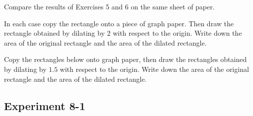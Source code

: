\documentclass[12pt]{book} %
\begin{document}
\begin{ExerciseList}
Compare the results of Exercises 5 and 6 on the same sheet of paper.

\Exercise In each case copy the rectangle onto a piece of graph paper. Then draw the rectangle obtained by dilating by 2 with respect to the origin. Write down the area of the original rectangle and the area of the dilated rectangle.


\Exercise Copy the rectangles below onto graph paper, then draw the rectangles obtained by dilating by $1.5$ with respect to the origin. Write down the area of the original rectangle and the area of the dilated rectangle.

\end{ExerciseList}

\subsection*{Experiment 8-1}
\end{document}
